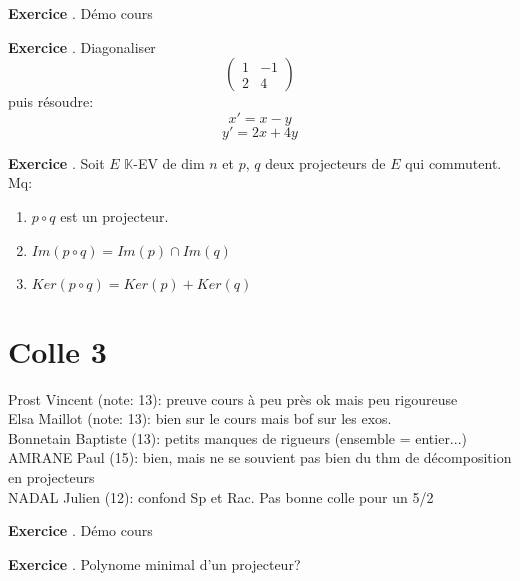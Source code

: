 \documentclass[10pt,a4paper]{article}
\newcounter{question}
\newcounter{exo}
\newenvironment{exo}{\vspace{0.5cm}\setcounter{question}{0}\addtocounter{exo}{1} \noindent \textbf{Exercice \theexo}. \normalsize }{\par}
\begin{document}
	\begin{exo}
		Démo cours
	\end{exo}
	
	\begin{exo}
		Diagonaliser 
		$$\begin{pmatrix}
		1 & -1 \\ 
		2 & 4
		\end{pmatrix}$$ 
		puis résoudre: 
		$$x' = x - y$$
		$$y' = 2x + 4y$$
	\end{exo}
	
	\begin{exo}
		Soit $E$ $\mathbb{K}$-EV de dim $n$ et $p$, $q$ deux projecteurs de $E$ qui commutent.
		Mq:
		\begin{enumerate}
			\item $p \circ q$ est un projecteur.
			\item $Im(p \circ q) = Im(p) \cap Im(q)$
			\item $Ker(p \circ q) = Ker(p) + Ker(q)$
		\end{enumerate}
	\end{exo}

	\section*{Colle 3}
	\setcounter{exo}{0}
	Prost Vincent (note: 13): preuve cours à peu près ok mais peu rigoureuse\\
	Elsa Maillot (note: 13): bien sur le cours mais bof sur les exos.\\
	Bonnetain Baptiste (13): petits manques de rigueurs (ensemble = entier...)\\
	AMRANE Paul (15): bien, mais ne se souvient pas bien du thm de décomposition en projecteurs\\
	NADAL Julien (12): confond Sp et Rac. Pas bonne colle pour un 5/2\\
	
	\begin{exo}
		Démo cours
	\end{exo}
	
	\begin{exo}
		Polynome minimal d'un projecteur?
	\end{exo}
\end{document}
